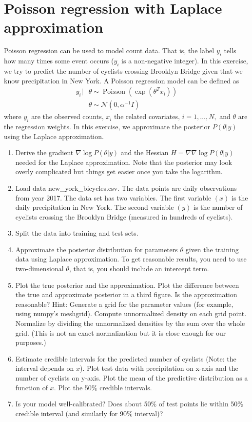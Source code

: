 \documentclass[12pt]{article}
\begin{document}
\section{Poisson regression with Laplace approximation}
\begin{tcolorbox}
    Poisson regression can be used to model count data. That is, the label $y_i$ tells how many times some event occurs ($y_i$ is a non-negative integer). In this exercise, we try to predict the number of cyclists crossing Brooklyn Bridge given that we know precipitation in New York. A Poisson regression model can be defined as
    \begin{align*}
        y_i | &\theta \sim \operatorname{Poisson}(\exp(\theta^Tx_i)) \\ 
        &\theta \sim \mathcal{N}(0,\alpha^{-1} I)
    \end{align*}
    where $y_i$ are the observed counts, $x_i$ the related covariates, $i = 1,\ldots,N,$ and $\theta$ are the regression weights. In this exercise, we approximate the posterior $P(\theta|y)$ using the Laplace approximation.
    \begin{enumerate}
        \item Derive the gradient $\nabla \log P(\theta|y)$ and the Hessian $H = \nabla \nabla \log P(\theta|y)$ needed for the Laplace approximation. Note that the posterior may look overly complicated but things get easier once you take the logarithm.
        \item Load data new\_york\_bicycles.csv. The data points are daily observations from year 2017. The data set has two variables. The first variable $(x)$ is the daily precipitation in New York. The second variable $(y)$ is the number of cyclists crossing the Brooklyn Bridge (measured in hundreds of cyclists).
        \item Split the data into training and test sets.
        \item Approximate the posterior distribution for parameters $\theta$ given the training data using Laplace approximation. To get reasonable results, you need to use two-dimensional $\theta$, that is, you should include an intercept term.
        \item Plot the true posterior and the approximation. Plot the difference between the true and approximate posterior in a third figure. Is the approximation reasonable? Hint: Generate a grid for the parameter values (for example, using numpy’s meshgrid). Compute unnormalized density on each grid point. Normalize by dividing the unnormalized densities by the sum over the whole grid. (This is not an exact normalization but it is close enough for our purposes.)
        \item Estimate credible intervals for the predicted number of cyclists (Note: the interval depends on $x$). Plot test data with precipitation on x-axis and the number of cyclists on y-axis. Plot the mean of the predictive distribution as a function of $x$. Plot the 50\% credible intervals.
        \item Is your model well-calibrated? Does about 50\% of test points lie within 50\% credible interval (and similarly for 90\% interval)?
    \end{enumerate}
\end{tcolorbox}
\end{document}
